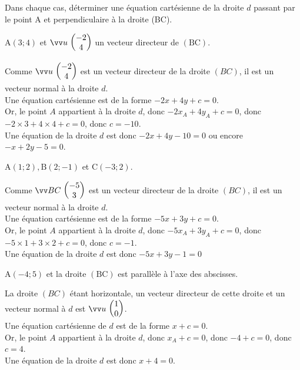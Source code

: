 \documentclass[12pt,a4paper]{article}  %
\begin{document}
\newpage
{}
Dans chaque cas, déterminer une équation cartésienne de la droite $d$ passant par le point $\mathrm{A}$ et perpendiculaire à la droite (BC).
\begin{enumMet}
    \item {} $\mathrm{A}(3 ; 4)$ et $\Coord{u}{-2}{4}$ un vecteur directeur de $(\mathrm{BC})$.\\
    \begin{corrBox}
        Comme $\Coord{u}{-2}{4}$ est un vecteur directeur de la droite $(B C)$, il est un vecteur normal à la droite $d$.\\
        Une équation cartésienne est de la forme $-2x+4 y+c=0$.\\
        Or, le point $A$ appartient à la droite $d$, donc $-2x_{A}+4y_{A}+c=0$, donc $-2 \times 3+4 \times 4+c=0$, donc $c=-10$.\\
        Une équation de la droite $d$ est donc $-2 x+4 y-10=0$ ou encore $-x+2y-5=0$.
    \end{corrBox}
    \item $\mathrm{A}(1 ; 2), \mathrm{B}(2 ;-1)$ et $\mathrm{C}(-3 ; 2)$.\\
    \begin{corrBox}
        Comme $\Coord{BC}{-5}{3}$  est un vecteur directeur de la droite $(B C)$, il est un vecteur normal à la droite $d$.\\
        Une équation cartésienne est de la forme $-5x+3y+c=0$.\\
        Or, le point $A$ appartient à la droite $d$, donc $-5x_{A}+3y_{A}+c=0$, donc $-5\times 1+3 \times 2+c=0$, donc $c=-1$.\\
        Une équation de la droite $d$ est donc $-5x+3 y-1=0$        
    \end{corrBox}
    \item $\mathrm{A}(-4 ; 5)$ et la droite $(\mathrm{BC})$ est parallèle à l'axe des abscisses.\\
    \begin{corrBox}
        La droite $(B C)$ étant horizontale, un vecteur directeur de cette droite et un vecteur normal à $d$ est $\Coord{u}{1}{0}$.\\
        Une équation cartésienne de $d$ est de la forme $x+c=0$.\\
        Or, le point $A$ appartient à la droite $d$, donc $x_{A}+c=0$, donc $-4+c=0$, donc $c=4$.\\
        Une équation de la droite $d$ est donc $x+4=0$.        
    \end{corrBox}
\end{enumMet}
\end{document}
